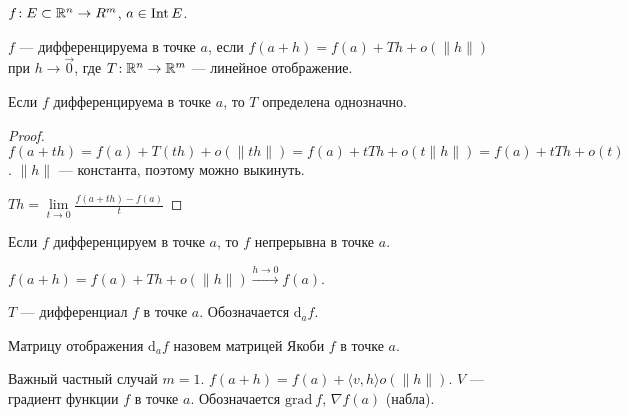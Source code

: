 \begin{definition}
    $f\!: E \subset \mathbb{R}^n \to R^m$,  $a \in \operatorname{Int} E$.

     $f$ --- дифференцируема в точке  $a$, если  $f(a+h) = f(a) + Th + o(\|h\|)$ при  $h \to \overrightarrow{0}$, где  $T\!: \mathbb{R}^n \to \mathbb{R}^m$ --- линейное отображение.
\end{definition}
\begin{remark}
    Если $f$ дифференцируема в точке  $a$, то  $T$ определена однозначно. 
\end{remark}
\begin{proof}
    $f(a+th) = f(a) + T(th) + o(\|th\|) = f(a) + tTh + o(t\|h\|) = f(a) + tTh + o(t)$. $\|h\|$ --- константа, поэтому можно выкинуть.

     $Th = \lim\limits_{t \to 0} \frac{f(a+th) - f(a)}{t}$
\end{proof}
\begin{remark}
    Если $f$ дифференцируем в точке  $a$, то  $f$ непрерывна в точке  $a$.

     $f(a+h) = f(a) + Th + o(\|h\|) \xrightarrow{h \to 0} f(a)$.
\end{remark}
\begin{definition}
    $T$ --- дифференциал $f$ в точке  $a$. Обозначается  $\mathrm{d}_af$. 
\end{definition}
\begin{definition}
    Матрицу отображения $\mathrm{d}_af$ назовем матрицей Якоби  $f$ в точке  $a$.
\end{definition}

Важный частный случай $m = 1$.  $f(a+h) = f(a) + \langle v, h \rangle o(\| h\|)$. $V$ --- градиент функции  $f$ в точке  $a$. Обозначается  $\text{grad}\ f$,  $\nabla f(a)$ (набла).

